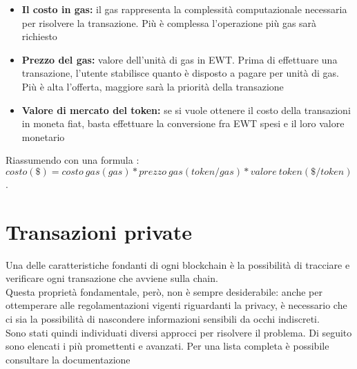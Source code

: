 \begin{itemize}
    \item \textbf{Il costo in gas:} il gas rappresenta la complessità computazionale necessaria per risolvere la transazione. Più è complessa l'operazione più gas sarà richiesto
    \item \textbf{Prezzo del gas:} valore dell'unità di gas in EWT. Prima di effettuare una transazione, l'utente stabilisce quanto è disposto a pagare per unità di gas. Più è alta l'offerta, maggiore sarà la priorità della transazione
    \item \textbf{Valore di mercato del token:} se si vuole ottenere il costo della transazioni in moneta fiat, basta effettuare la conversione fra EWT spesi e il loro valore monetario
\end{itemize}

Riassumendo con una formula \cite{wiki:ew-transaction-cost}: \\
$ costo(\$) = costo\ gas(gas) * prezzo\ gas(token/gas) * valore\ token (\$/token) $. \\


\section{Transazioni private}
Una delle caratteristiche fondanti di ogni blockchain è la possibilità di tracciare e verificare ogni transazione che avviene sulla chain. \\
Questa proprietà fondamentale, però, non è sempre desiderabile: anche per ottemperare alle regolamentazioni vigenti riguardanti la privacy, è necessario che ci sia la possibilità di nascondere informazioni sensibili da occhi indiscreti. \\
Sono stati quindi individuati diversi approcci per risolvere il problema.
Di seguito sono elencati i più promettenti e avanzati.
Per una lista completa è possibile consultare la documentazione \cite{wiki:ew-privacy}

